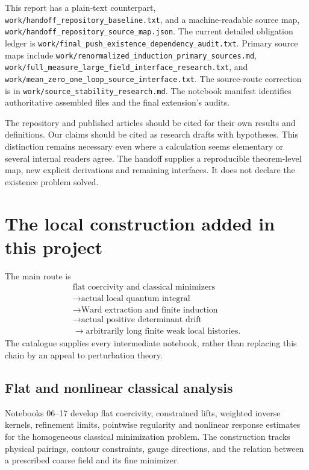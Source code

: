 \documentclass[11pt]{article}
\providecommand{\hrbpath}[1]{\nolinkurl{#1}}
\theoremstyle{remark}
\begin{document}
This report has a plain-text
counterpart,
\hrbpath{work/handoff_repository_baseline.txt},
and a machine-readable source map,
\hrbpath{work/handoff_repository_source_map.json}.
The current detailed obligation
ledger is
\hrbpath{work/final_push_existence_dependency_audit.txt}.
Primary source maps include
\hrbpath{work/renormalized_induction_primary_sources.md},
\hrbpath{work/full_measure_large_field_interface_research.txt},
and
\hrbpath{work/mean_zero_one_loop_source_interface.txt}.
The source-route correction is
in \hrbpath{work/source_stability_research.md}.
The notebook manifest identifies
authoritative assembled files
and the final extension's audits.

The repository and published
articles should be cited for
their own results and definitions.
Our claims should be cited as
research drafts with hypotheses.
This distinction remains necessary
even where a calculation seems
elementary or several internal
readers agree. The handoff supplies
a reproducible theorem-level map,
new explicit derivations and
remaining interfaces. It does
not declare the existence
problem solved.

\section{The local construction added in this project}
\label{hdc-local}

The main route is
\[
 \begin{gathered}
 \text{flat coercivity and classical minimizers}\\
 \longrightarrow\text{actual local quantum integral}\\
 \longrightarrow\text{Ward extraction and finite induction}\\
 \longrightarrow\text{actual positive determinant drift}\\
 \longrightarrow\text{arbitrarily long finite weak local histories}.
 \end{gathered}
\]
The catalogue supplies every intermediate notebook, rather than
replacing this chain by an appeal to perturbation theory.

\subsection{Flat and nonlinear classical analysis}

Notebooks 06--17 develop flat coercivity, constrained lifts,
weighted inverse kernels, refinement limits, pointwise regularity
and nonlinear response estimates for the homogeneous classical
minimization problem. The construction tracks physical pairings,
contour constraints, gauge directions, and the relation between
a prescribed coarse field and its fine minimizer.
\end{document}
